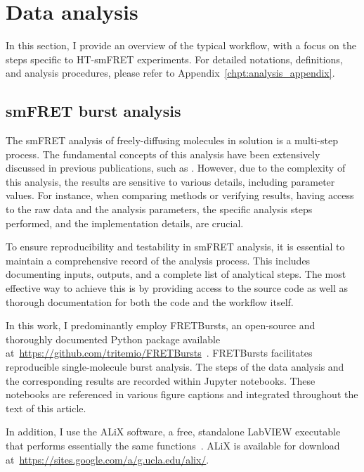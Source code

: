 \section{Data analysis}
\label{sec:analysis}

In this section, I provide an overview of the typical workflow, with a focus on the steps specific to \ac{HT-smFRET} experiments. 
For detailed notations, definitions, and analysis procedures, please refer to Appendix~\ref{chpt:analysis_appendix}.

\subsection{smFRET burst analysis}
\label{sec:FRETBursts_analysis}

The \ac{smFRET} analysis of freely-diffusing molecules in solution is a multi-step process. 
The fundamental concepts of this analysis have been extensively discussed in previous publications, such as \cite{fries_JPCA_1998, ying_JPCB_2000, eggeling_JB_2001, lee_BPJ_2005, nir_JPCB_2006, sisamakis_MIE_2010, kudryavtsev_CPC_2012, ingargiola_PLOS1_2016}. 
However, due to the complexity of this analysis, the results are sensitive to various details, including parameter values.
For instance, when comparing methods or verifying results, having access to the raw data and the analysis parameters, the specific analysis steps performed, and the implementation details, are crucial.

To ensure reproducibility and testability in \ac{smFRET} analysis, it is essential to maintain a comprehensive record of the analysis process.
This includes documenting inputs, outputs, and a complete list of analytical steps. 
The most effective way to achieve this is by providing access to the source code as well as thorough documentation for both the code and the workflow itself.

In this work, I predominantly employ FRETBursts, an open-source and thoroughly documented Python package available at~\href{https://github.com/tritemio/FRETBursts}{https://github.com/tritemio/FRETBursts}~\cite{ingargiola_PLOS1_2016}. 
FRETBursts facilitates reproducible single-molecule burst analysis. 
The steps of the data analysis and the corresponding results are recorded within Jupyter notebooks. 
These notebooks are referenced in various figure captions and integrated throughout the text of this article.

In addition, I use the ALiX software, a free, standalone LabVIEW executable that performs essentially the same functions~\cite{ingargiola_PLOS1_2016}. 
ALiX is available for download at~\href{https://sites.google.com/a/g.ucla.edu/alix/}{https://sites.google.com/a/g.ucla.edu/alix/}.

